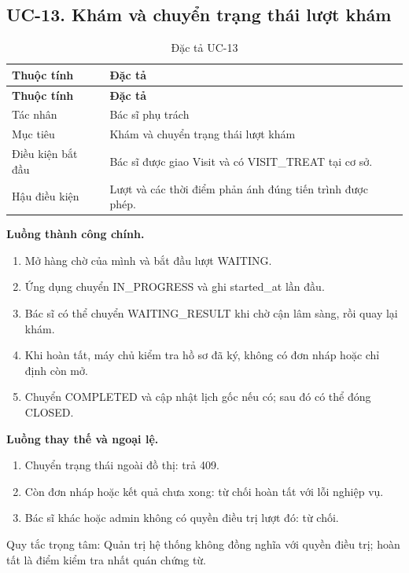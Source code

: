 \clearpage

\subsection{UC-13.\allowbreak{} Khám và chuyển trạng thái lượt khám}
\label{uc:13}

{\small\setlength{\tabcolsep}{3pt}\renewcommand{\arraystretch}{1.12}
\begin{longtable}{@{}L{\textwidth-1.32pt\relax} L{\textwidth-4.68pt\relax}@{}}
\caption{Đặc tả UC-13}\\
\toprule
\textbf{Thuộc tính} & \textbf{Đặc tả}\\\midrule
\endfirsthead
\toprule
\textbf{Thuộc tính} & \textbf{Đặc tả}\\\midrule
\endhead
\bottomrule\endlastfoot
Tác nhân & Bác sĩ phụ trách\\[3pt]
Mục tiêu & Khám và chuyển trạng thái lượt khám\\[3pt]
Điều kiện bắt đầu & Bác sĩ được giao Visit và có VISIT\_\allowbreak{}TREAT tại cơ sở.\allowbreak{}\\[3pt]
Hậu điều kiện & Lượt và các thời điểm phản ánh đúng tiến trình được phép.\allowbreak{}\\[3pt]
\end{longtable}}
\noindent\textbf{Luồng thành công chính.}
\begin{enumerate}
\item Mở hàng chờ của mình và bắt đầu lượt WAITING.\allowbreak{}
\item Ứng dụng chuyển IN\_\allowbreak{}PROGRESS và ghi started\_\allowbreak{}at lần đầu.\allowbreak{}
\item Bác sĩ có thể chuyển WAITING\_\allowbreak{}RESULT khi chờ cận lâm sàng, rồi quay lại khám.\allowbreak{}
\item Khi hoàn tất, máy chủ kiểm tra hồ sơ đã ký, không có đơn nháp hoặc chỉ định còn mở.\allowbreak{}
\item Chuyển COMPLETED và cập nhật lịch gốc nếu có; sau đó có thể đóng CLOSED.\allowbreak{}
\end{enumerate}
\noindent\textbf{Luồng thay thế và ngoại lệ.}
\begin{enumerate}
\item Chuyển trạng thái ngoài đồ thị:\allowbreak{} trả 409.\allowbreak{}
\item Còn đơn nháp hoặc kết quả chưa xong:\allowbreak{} từ chối hoàn tất với lỗi nghiệp vụ.\allowbreak{}
\item Bác sĩ khác hoặc admin không có quyền điều trị lượt đó:\allowbreak{} từ chối.\allowbreak{}
\end{enumerate}
Quy tắc trọng tâm:\allowbreak{} Quản trị hệ thống không đồng nghĩa với quyền điều trị; hoàn tất là điểm kiểm tra nhất quán chứng từ.\allowbreak{}


